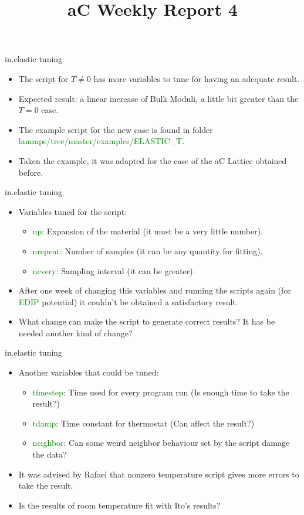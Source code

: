 \documentclass[11pt]{beamer}
\begin{document}
\title[aC-WR4]{aC Weekly Report 4} 
\begin{frame}
\titlepage 
\end{frame}
\begin{frame}{in.elastic tuning}
\begin{itemize}
    \item The script for $T\neq 0$ has more variables to tune for having an adequate result.
    \item Expected result: a linear increase of Bulk Moduli, a little bit greater than the $T=0$ case.
    \item The example script for the new case is found in folder \textcolor{green}{lammps/tree/master/examples/ELASTIC\_T}.
    \item Taken the example, it was adapted for the case of the aC Lattice obtained before.
\end{itemize}
\end{frame}
\begin{frame}{in.elastic tuning}
\begin{itemize}
    \item Variables tuned for the script:
    \begin{itemize}
        \item \textcolor{green}{up}: Expansion of the material (it must be a very little number).
        \item \textcolor{green}{nrepeat}: Number of samples (it can be any quantity for fitting).
        \item \textcolor{green}{nevery}: Sampling interval (it can be greater).
    \end{itemize}
    \item After one week of changing this variables and running the scripts again (for \textcolor{green}{EDIP} potential) it couldn't be obtained a satisfactory result.
    \item What change can make the script to generate correct results? It has be needed another kind of change?
\end{itemize}
\end{frame}
\begin{frame}{in.elastic tuning}
\begin{itemize}
    \item Another variables that could be tuned:
    \begin{itemize}
        \item \textcolor{green}{timestep}: Time used for every program run (Is enough time to take the result?)
        \item \textcolor{green}{tdamp}: Time constant for thermostat (Can affect the result?)
        \item \textcolor{green}{neighbor}: Can some weird neighbor behaviour set by the script damage the data?
    \end{itemize}
    \item It was advised by Rafael that nonzero temperature script gives more errors to take the result.
    \item Is the results of room temperature fit with Ito's results? 
\end{itemize}
\end{frame}
\end{document}
